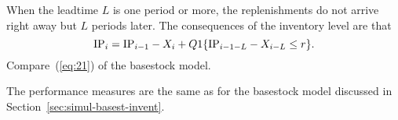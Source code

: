When the leadtime $L$ is one period or more, the replenishments do not
arrive right away but $L$ periods later. The consequences of the
inventory level are that
\begin{equation}
  \textrm{IP}_i = \textrm{IP}_{i-1} - X_i + Q1\{\textrm{IP}_{i-1-L} - X_{i-L}\leq r\}.
\end{equation}
Compare~(\ref{eq:21}) of the basestock model.

The performance measures are the same as for the basestock model discussed in Section~\ref{sec:simul-basest-invent}.



